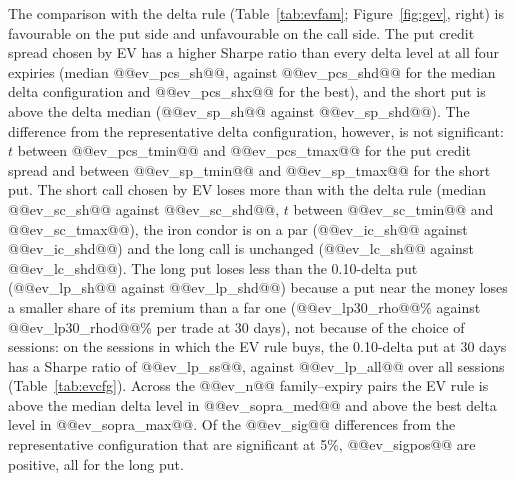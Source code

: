 \documentclass[11pt,a4paper]{article}
\begin{document}
The comparison with the delta rule (Table~\ref{tab:evfam}; Figure~\ref{fig:gev}, right) is favourable on the put side and unfavourable on the call side. The put credit spread chosen by EV has a higher Sharpe ratio than every delta level at all four expiries (median @@ev_pcs_sh@@, against @@ev_pcs_shd@@ for the median delta configuration and @@ev_pcs_shx@@ for the best), and the short put is above the delta median (@@ev_sp_sh@@ against @@ev_sp_shd@@). The difference from the representative delta configuration, however, is not significant: $t$ between @@ev_pcs_tmin@@ and @@ev_pcs_tmax@@ for the put credit spread and between @@ev_sp_tmin@@ and @@ev_sp_tmax@@ for the short put. The short call chosen by EV loses more than with the delta rule (median @@ev_sc_sh@@ against @@ev_sc_shd@@, $t$ between @@ev_sc_tmin@@ and @@ev_sc_tmax@@), the iron condor is on a par (@@ev_ic_sh@@ against @@ev_ic_shd@@) and the long call is unchanged (@@ev_lc_sh@@ against @@ev_lc_shd@@). The long put loses less than the 0.10-delta put (@@ev_lp_sh@@ against @@ev_lp_shd@@) because a put near the money loses a smaller share of its premium than a far one (@@ev_lp30_rho@@\% against @@ev_lp30_rhod@@\% per trade at 30 days), not because of the choice of sessions: on the sessions in which the EV rule buys, the 0.10-delta put at 30 days has a Sharpe ratio of @@ev_lp_ss@@, against @@ev_lp_all@@ over all sessions (Table~\ref{tab:evcfg}). Across the @@ev_n@@ family--expiry pairs the EV rule is above the median delta level in @@ev_sopra_med@@ and above the best delta level in @@ev_sopra_max@@. Of the @@ev_sig@@ differences from the representative configuration that are significant at 5\%, @@ev_sigpos@@ are positive, all for the long put.

\begin{table}[ht]\centering\footnotesize
\caption{EV rule and delta rule in the representative configurations of Section~\ref{sec:gstrike}, bid-ask prices, 2012--2023. For each family: the EV rule, the delta rule on all sessions and the delta rule on the sessions in which the EV rule opens a trade. Number of trades, average absolute delta of the main leg, width as a percentage of the forward, expected and realized return per trade, share of profitable trades, annual mean, Sharpe ratio, maximum drawdown and worst month of the monthly ladder on margin; $t$ statistic (Newey--West) of the monthly return difference between the EV rule and the delta rule on all sessions.}\label{tab:evcfg}
\end{table}
\end{document}
